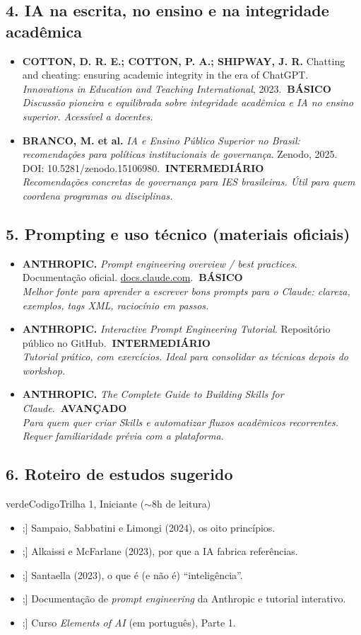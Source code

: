 \documentclass[11pt,a4paper]{article}
\newcommand{\checkboxicon}[1]{\tikz[baseline=-0.05cm]{\node[draw=#1,thick,rounded corners=1.2pt,minimum width=0.34cm,minimum height=0.34cm,inner sep=0pt]{};}}
\newcommand{\itemcheck}[2][azulUNI]{\item[\checkboxicon{#1}] #2}
\newcommand{\refc}[2]{\item #1\\{\footnotesize\color{cinzaescuro}\textit{#2}}}
\newcommand{\nivelbasico}{\hfill\colorbox{verdeCodigo}{\color{white}\scriptsize\poppinsmed\textbf{~BÁSICO~}}}
\newcommand{\nivelinterm}{\hfill\colorbox{amareloSol}{\color{black}\scriptsize\poppinsmed\textbf{~INTERMEDIÁRIO~}}}
\newcommand{\nivelavancado}{\hfill\colorbox{laranjaDestaque}{\color{white}\scriptsize\poppinsmed\textbf{~AVANÇADO~}}}
\begin{document}
\subsection*{4. IA na escrita, no ensino e na integridade acadêmica}
\begin{itemize}[leftmargin=1.4em]
\refc{\textbf{COTTON, D. R. E.; COTTON, P. A.; SHIPWAY, J. R.} Chatting and cheating: ensuring academic integrity in the era of ChatGPT. \textit{Innovations in Education and Teaching International}, 2023.\nivelbasico}{Discussão pioneira e equilibrada sobre integridade acadêmica e IA no ensino superior. Acessível a docentes.}
\refc{\textbf{BRANCO, M. et al.} \textit{IA e Ensino Público Superior no Brasil: recomendações para políticas institucionais de governança}. Zenodo, 2025. DOI: 10.5281/zenodo.15106980.\nivelinterm}{Recomendações concretas de governança para IES brasileiras. Útil para quem coordena programas ou disciplinas.}
\end{itemize}

\subsection*{5. Prompting e uso técnico (materiais oficiais)}
\begin{itemize}[leftmargin=1.4em]
\refc{\textbf{ANTHROPIC.} \textit{Prompt engineering overview / best practices}. Documentação oficial. \url{docs.claude.com}.\nivelbasico}{Melhor fonte para aprender a escrever bons prompts para o Claude: clareza, exemplos, tags XML, raciocínio em passos.}
\refc{\textbf{ANTHROPIC.} \textit{Interactive Prompt Engineering Tutorial}. Repositório público no GitHub.\nivelinterm}{Tutorial prático, com exercícios. Ideal para consolidar as técnicas depois do workshop.}
\refc{\textbf{ANTHROPIC.} \textit{The Complete Guide to Building Skills for Claude}.\nivelavancado}{Para quem quer criar \textit{Skills} e automatizar fluxos acadêmicos recorrentes. Requer familiaridade prévia com a plataforma.}
\end{itemize}

\clearpage
\subsection*{6. Roteiro de estudos sugerido}
\begin{checklist}{verdeCodigo}{Trilha 1, Iniciante ($\sim$8h de leitura)}
\begin{itemize}[leftmargin=1.6em, itemsep=4pt]
  \itemcheck[verdeCodigo]{Sampaio, Sabbatini e Limongi (2024), os oito princípios.}
  \itemcheck[verdeCodigo]{Alkaissi e McFarlane (2023), por que a IA fabrica referências.}
  \itemcheck[verdeCodigo]{Santaella (2023), o que é (e não é) ``inteligência''.}
  \itemcheck[verdeCodigo]{Documentação de \textit{prompt engineering} da Anthropic e tutorial interativo.}
  \itemcheck[verdeCodigo]{Curso \textit{Elements of AI} (em português), Parte 1.}
\end{itemize}
\end{checklist}
\end{document}
